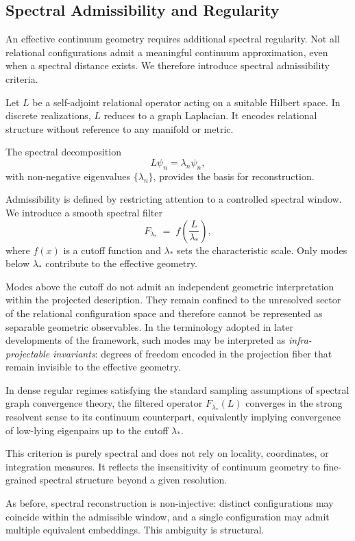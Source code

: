 \subsection{Spectral Admissibility and Regularity}
  \label{subsec:spectral-admissibility}

  An effective continuum geometry requires additional spectral regularity.
  Not all relational configurations admit a meaningful continuum approximation,
  even when a spectral distance exists.
  We therefore introduce spectral admissibility criteria.

  Let $L$ be a self-adjoint relational operator acting on a suitable Hilbert space.
  In discrete realizations, $L$ reduces to a graph Laplacian.
  It encodes relational structure without reference to any manifold or metric.

  The spectral decomposition
  \begin{equation}
    L \psi_n = \lambda_n \psi_n ,
  \end{equation}
  with non-negative eigenvalues $\{\lambda_n\}$,
  provides the basis for reconstruction.

  Admissibility is defined by restricting attention to a controlled spectral window.
  We introduce a smooth spectral filter
  \begin{equation}
    F_{\lambda_*} \;=\; f\!\left(\frac{L}{\lambda_*}\right),
  \end{equation}
  where $f(x)$ is a cutoff function and $\lambda_*$ sets the characteristic scale.
  Only modes below $\lambda_*$ contribute to the effective geometry.

  Modes above the cutoff do not admit an independent geometric interpretation
  within the projected description.
  They remain confined to the unresolved sector of the relational configuration
  space and therefore cannot be represented as separable geometric observables.
  In the terminology adopted in later developments of the framework, such modes
  may be interpreted as \emph{infra-projectable invariants}: degrees of freedom
  encoded in the projection fiber that remain invisible to the effective geometry.

  In dense regular regimes satisfying the standard sampling assumptions of
  spectral graph convergence theory, the filtered operator $F_{\lambda_*}(L)$
  converges in the strong resolvent sense to its continuum counterpart,
  equivalently implying convergence of low-lying eigenpairs up to the cutoff $\lambda_*$.

  This criterion is purely spectral and does not rely on locality,
  coordinates, or integration measures.
  It reflects the insensitivity of continuum geometry to
  fine-grained spectral structure beyond a given resolution.

  As before, spectral reconstruction is non-injective:
  distinct configurations may coincide within the admissible window,
  and a single configuration may admit multiple equivalent embeddings.
  This ambiguity is structural.
